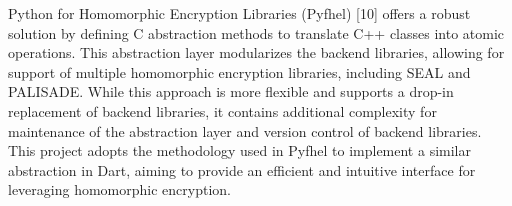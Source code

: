 Python for Homomorphic Encryption Libraries (Pyfhel) [10] offers a robust solution by defining C abstraction methods to translate C++ classes into atomic operations. This abstraction layer modularizes the backend libraries, allowing for support of multiple homomorphic encryption libraries, including SEAL and PALISADE. While this approach is more flexible and supports a drop-in replacement of backend libraries, it contains additional complexity for maintenance of the abstraction layer and version control of backend libraries. This project adopts the methodology used in Pyfhel to implement a similar abstraction in Dart, aiming to provide an efficient and intuitive interface for leveraging homomorphic encryption.
